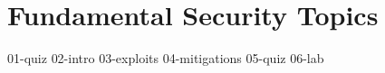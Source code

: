 \chapter{Fundamental Security Topics}

{01-quiz}
{02-intro}
{03-exploits}
{04-mitigations}
{05-quiz}
{06-lab}

